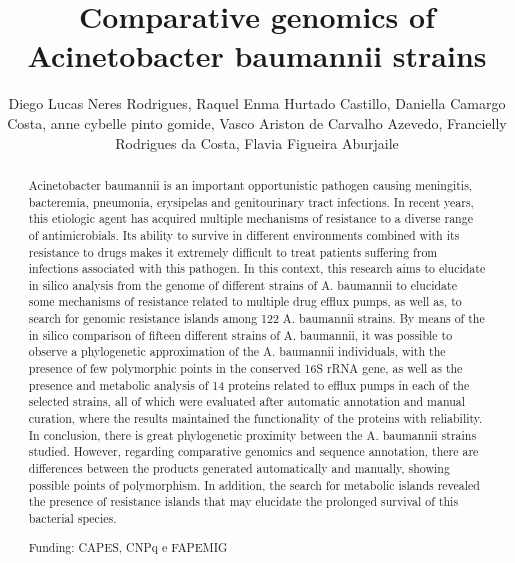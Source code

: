 \documentclass[twoside]{article}
\title{\vspace{-15mm}\fontsize{24pt}{10pt}\selectfont\textbf{ Comparative genomics of Acinetobacter baumannii strains }} %
\author{ Diego Lucas Neres Rodrigues, Raquel Enma Hurtado Castillo, Daniella Camargo Costa, anne cybelle pinto gomide, Vasco Ariston de Carvalho Azevedo, Francielly Rodrigues da Costa, Flavia Figueira Aburjaile }
\affil{ Universidade Federal de Minas Gerais }
\date{}
\begin{document}
  
  
  \maketitle %
  
  
  \thispagestyle{fancy} %
  
  
  \begin{abstract}
  Acinetobacter baumannii is an important opportunistic pathogen causing meningitis,  bacteremia, 
pneumonia,  erysipelas and genitourinary tract infections. In recent years,  this etiologic agent has
acquired multiple mechanisms of resistance to a diverse range of antimicrobials. Its ability to
survive in different environments combined with its resistance to drugs makes it extremely difficult
to treat patients suffering from infections associated with this pathogen. In this context,  this research
aims to elucidate in silico analysis from the genome of different strains of A. baumannii to elucidate
some mechanisms of resistance related to multiple drug efflux pumps,  as well as,  to search for
genomic resistance islands among 122 A. baumannii strains. By means of the in silico comparison
of fifteen different strains of A. baumannii,  it was possible to observe a phylogenetic approximation
of the A. baumannii individuals,  with the presence of few polymorphic points in the conserved 16S
rRNA gene,  as well as the presence and metabolic analysis of 14 proteins related to efflux pumps in
each of the selected strains,  all of which were evaluated after automatic annotation and manual
curation,  where the results maintained the functionality of the proteins with reliability. In conclusion, 
there is great phylogenetic proximity between the A. baumannii strains studied. However, 
regarding comparative genomics and sequence annotation,  there are differences between the
products generated automatically and manually,  showing possible points of polymorphism. In
addition,  the search for metabolic islands revealed the presence of resistance islands that may
elucidate the prolonged survival of this bacterial species.
  
  Funding: CAPES,  CNPq e FAPEMIG \\ 
  \end{abstract}
  
\end{document}
